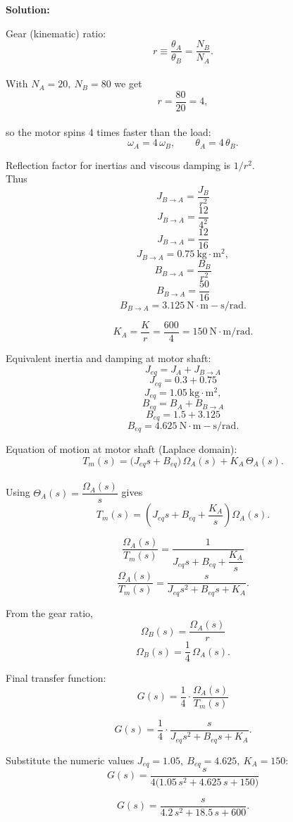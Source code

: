\textbf{Solution:}

Gear (kinematic) ratio:
\[
r \equiv \frac{\theta_A}{\theta_B}=\frac{N_B}{N_A}.
\]  \\

With \(N_A=20,\ N_B=80\) we get
\[
r=\frac{80}{20}=4,
\] \\

so the motor spins 4 times faster than the load:
\[
\omega_A = 4\,\omega_B,\qquad \theta_A = 4\,\theta_B.
\]

Reflection factor for inertias and viscous damping is \(1/r^2\). \\

Thus
\[
J_{B\to A} = \frac{J_B}{r^2} 
\]
\[
J_{B\to A}= \frac{12}{4^2} 
\]
\[
J_{B\to A}= \frac{12}{16} 
\]
\[
J_{B\to A}= 0.75\ \mathrm{kg\cdot m^2},
\]
\[
B_{B\to A} = \frac{B_B}{r^2} 
\]
\[
B_{B\to A}= \frac{50}{16} 
\]
\[
B_{B\to A}= 3.125\ \mathrm{N\cdot m\!-\!s/rad}.
\]

\[
K_{A} = \frac{K}{r} = \frac{600}{4} = 150\ \mathrm{N\cdot m/rad}.
\]

Equivalent inertia and damping at motor shaft:
\[
J_{eq} = J_A + J_{B\to A} 
\]
\[
J_{eq} = 0.3 + 0.75 
\]
\[
J_{eq} = 1.05\ \mathrm{kg\cdot m^2},
\]
\[
B_{eq} = B_A + B_{B\to A} 
\]
\[
B_{eq} = 1.5 + 3.125 
\]
\[
B_{eq} = 4.625\ \mathrm{N\cdot m\!-\!s/rad}.
\]

Equation of motion at motor shaft (Laplace domain):  
\[
T_m(s) = \big(J_{eq}s + B_{eq}\big)\,\Omega_A(s) + K_{A}\,\Theta_A(s).
\] \\

Using $\Theta_A(s)=\dfrac{\Omega_A(s)}{s}$ gives
\[
T_m(s) = \left(J_{eq}s + B_{eq} + \frac{K_{A}}{s}\right)\Omega_A(s).
\]

\[
\frac{\Omega_A(s)}{T_m(s)} = \frac{1}{J_{eq}s + B_{eq} + \dfrac{K_{A}}{s}}
\]
\[
\frac{\Omega_A(s)}{T_m(s)}= \frac{s}{J_{eq}s^2 + B_{eq}s + K_{A}}.
\]

From the gear ratio,
\[
\Omega_B(s) = \frac{\Omega_A(s)}{r} 
\]
\[
\Omega_B(s) = \frac{1}{4}\,\Omega_A(s).
\]

Final transfer function:
\[
G(s)=\frac{1}{4}\cdot\frac{\Omega_A(s)}{T_m(s)}
\]

\[
G(s)= \frac{1}{4}\cdot\frac{s}{J_{eq}s^2 + B_{eq}s + K_{A}}.
\]

Substitute the numeric values \(J_{eq}=1.05,\ B_{eq}=4.625,\ K_{A}=150\):
\[
G(s)=\frac{s}{4\big(1.05\,s^2 + 4.625\,s + 150\big)}
\]

\[
G(s)= \frac{s}{4.2\,s^2 + 18.5\,s + 600}.
\]

